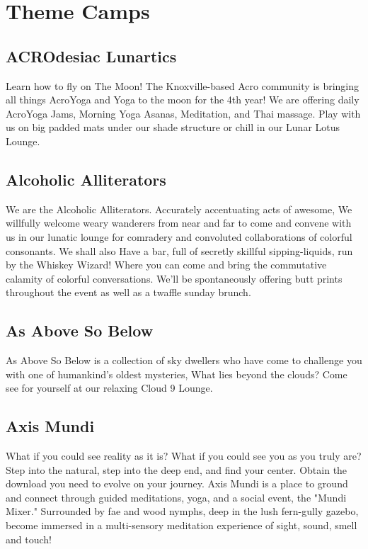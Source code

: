 %
%

\chapter{Theme Camps}
\label{ch:themecamps}

\ifisflight
\putchapterthumb
\fi

\section*{ACROdesiac Lunartics}
Learn how to fly on The Moon! The Knoxville-based Acro community is bringing all things AcroYoga and Yoga to the moon for the 4th year! We are offering daily AcroYoga Jams, Morning Yoga Asanas, Meditation, and Thai massage. Play with us on big padded mats under our shade structure or chill in our Lunar Lotus Lounge. 


\section*{Alcoholic Alliterators}
We are the Alcoholic Alliterators. Accurately accentuating acts of awesome, We willfully welcome weary wanderers from near and far to come and convene with us in our lunatic lounge for comradery and convoluted collaborations of colorful consonants. We shall also Have a bar, full of secretly skillful sipping-liquids, run by the Whiskey Wizard! Where you can come and bring the commutative calamity of colorful conversations. We'll be spontaneously offering butt prints throughout the event as well as a twaffle sunday brunch. 


\section*{As Above So Below}
As Above So Below is a collection of sky dwellers who have come to challenge you with one of humankind's oldest mysteries, What lies beyond the clouds? Come see for yourself at our relaxing Cloud 9 Lounge. 


\section*{Axis Mundi}
What if you could see reality as it is? What if you could see you as you truly are? Step into the natural, step into the deep end, and find your center. Obtain the download you need to evolve on your journey. Axis Mundi is a place to ground and connect through guided meditations, yoga, and a social event, the "Mundi Mixer." Surrounded by fae and wood nymphs, deep in the lush fern-gully gazebo, become immersed in a multi-sensory meditation experience of sight, sound, smell and touch! 


